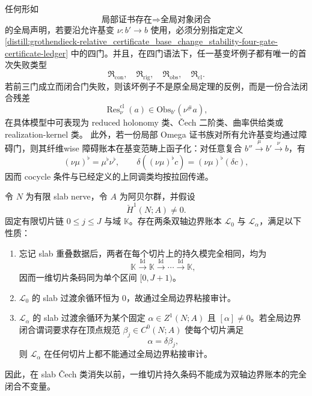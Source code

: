 \begin{theorem}[相对证书基变的残差正规形]\label{distill:grothendieck-relative_certificate_base_change_stability-four-gate-certificate-normal-form}
任何形如
\[
\text{局部证书存在}\Longrightarrow \text{全局对象闭合}
\]
的全局声明，若要沿允许基变 \(\nu:b'\to b\) 使用，必须分别指定定义 \ref{distill:grothendieck-relative_certificate_base_change_stability-four-gate-certificate-ledger} 中的四门。并且，在四门语法下，任一基变坏例子都有唯一的首次失败类型
\[
\mathfrak R_{\mathrm{con}},\quad
\mathfrak R_{\mathrm{rig}},\quad
\mathfrak R_{\mathrm{obs}},\quad
\mathfrak R_{\mathrm{cl}} .
\]
若前三门成立而闭合门失败，则该坏例子不是原全局定理的反例，而是一份合法闭合残差
\[
\operatorname{Res}^{\mathrm{cl}}_\nu(a)\in \mathrm{Obs}_{b'}(\nu^\#a),
\]
在具体模型中可表现为 reduced holonomy 类、\v{C}ech 二阶类、曲率供给类或 realization-kernel 类。
此外，若一份局部 Omega 证书族对所有允许基变均通过障碍门，则其纤维wise 障碍账本在基变范畴上函子化：对任意复合 \(b''\xrightarrow{\mu}b'\xrightarrow{\nu}b\)，有
\[
(\nu\mu)^\flat=\mu^\flat\nu^\flat,
\qquad
\delta((\nu\mu)^\flat c)=(\nu\mu)^\flat(\delta c),
\]
因而 cocycle 条件与已经定义的上同调类均按拉回传递。
\end{theorem}
\begin{theorem}\label{thm:distill-biaxial-slice-barcode-cech-separation}
令 \(N\) 为有限 slab nerve，令 \(A\) 为阿贝尔群，并假设
\[
\check H^1(N;A)\ne0 .
\]
固定有限切片链 \(0\le j\le J\) 与域 \(\mathbb K\)。存在两条双轴边界账本 \(\mathcal L_0\) 与 \(\mathcal L_\alpha\)，满足以下性质：
\begin{enumerate}
  \item 忘记 slab 重叠数据后，两者在每个切片上的持久模完全相同，均为
  \[
  \mathbb K\xrightarrow{\mathrm{Id}}\mathbb K\xrightarrow{\mathrm{Id}}\cdots\xrightarrow{\mathrm{Id}}\mathbb K,
  \]
  因而一维切片条码同为单个区间 \([0,J+1)\)。
  \item \(\mathcal L_0\) 的 slab 过渡余循环恒为 \(0\)，故通过全局边界粘接审计。
  \item \(\mathcal L_\alpha\) 的 slab 过渡余循环为某个固定 \(\alpha\in Z^1(N;A)\) 且 \([\alpha]\ne0\)。若全局边界闭合谓词要求存在顶点规范 \(\beta_j\in C^0(N;A)\) 使每个切片满足
  \[
  \alpha=\delta\beta_j,
  \]
  则 \(\mathcal L_\alpha\) 在任何切片上都不能通过全局边界粘接审计。
\end{enumerate}
因此，在 slab \v Cech 类消失以前，一维切片持久条码不能成为双轴边界账本的完全闭合不变量。
\end{theorem}
